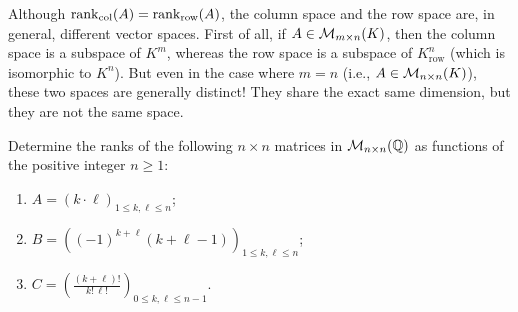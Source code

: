 \begin{importantremark}
Although $\operatorname{rank}_{\text{col}}(A) = \operatorname{rank}_{\text{row}}(A)$, the column space and the row space are, in general, different vector spaces. First of all, if $A \in \mathcal{M}_{m \times n}(K)$, then the column space is a subspace of $K^m$, whereas the row space is a subspace of $K_{\text{row}}^n$ (which is isomorphic to $K^n$). But even in the case where $m = n$ (i.e., $A \in \mathcal{M}_{n \times n}(K)$), these two spaces are generally distinct! They share the exact same dimension, but they are not the same space.
\end{importantremark}

\begin{exercise}
\label{exc:ranks_parametric_families_rational_matrices}
Determine the ranks of the following $n \times n$ matrices in $\mathcal{M}_{n \times n}(\mathbb{Q})$ as functions of the positive integer $n \ge 1$:
\begin{enumerate}
    \item $A = (k \cdot \ell)_{1 \le k, \ell \le n}$;
    \item $B = \left( (-1)^{k+\ell} (k + \ell - 1) \right)_{1 \le k, \ell \le n}$;
    \item $C = \left( \frac{(k + \ell)!}{k! \, \ell!} \right)_{0 \le k, \ell \le n-1}$.
\end{enumerate}
\end{exercise}



